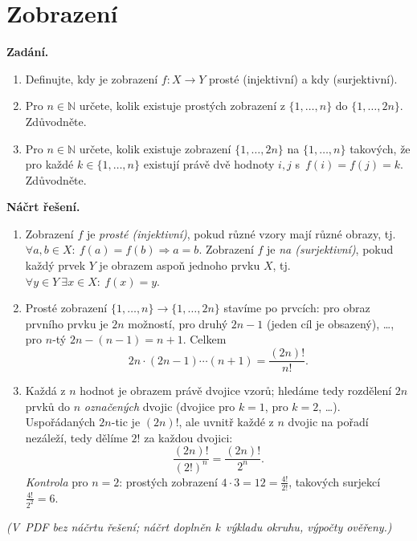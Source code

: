 \section{Zobrazení}

\noindent\textbf{Zadání.}\par
\begin{enumerate}
  \item Definujte, kdy je zobrazení $f\colon X\to Y$ prosté (injektivní) a kdy  (surjektivní).
  \item Pro $n\in\mathbb{N}$ určete, kolik existuje prostých zobrazení z $\{1,\dots,n\}$ do $\{1,\dots,2n\}$. Zdůvodněte.
  \item Pro $n\in\mathbb{N}$ určete, kolik existuje zobrazení $\{1,\dots,2n\}$ na $\{1,\dots,n\}$ takových, že pro každé $k\in\{1,\dots,n\}$ existují právě dvě hodnoty $i,j$ s~$f(i)=f(j)=k$. Zdůvodněte.
\end{enumerate}

\medskip
\noindent\textbf{Náčrt řešení.}\par
\begin{enumerate}
  \item Zobrazení $f$ je \emph{prosté (injektivní)}, pokud různé vzory mají různé obrazy, tj. $\forall a,b\in X:\ f(a)=f(b)\Rightarrow a=b$. Zobrazení $f$ je \emph{na (surjektivní)}, pokud každý prvek $Y$ je obrazem aspoň jednoho prvku $X$, tj. $\forall y\in Y\ \exists x\in X:\ f(x)=y$.
  \item Prosté zobrazení $\{1,\dots,n\}\to\{1,\dots,2n\}$ stavíme po prvcích: pro obraz prvního prvku je $2n$ možností, pro druhý $2n-1$ (jeden cíl je obsazený), \dots, pro $n$-tý $2n-(n-1)=n+1$. Celkem
    \[
      2n\cdot(2n-1)\cdots(n+1)=\frac{(2n)!}{n!}.
    \]
  \item Každá z $n$ hodnot je obrazem právě dvojice vzorů; hledáme tedy rozdělení $2n$ prvků do $n$ \emph{označených} dvojic (dvojice pro $k=1$, pro $k=2$, \dots). Uspořádaných $2n$-tic je $(2n)!$, ale uvnitř každé z $n$ dvojic na pořadí nezáleží, tedy dělíme $2!$ za každou dvojici:
    \[
      \frac{(2n)!}{(2!)^n}=\frac{(2n)!}{2^n}.
    \]
    \emph{Kontrola} pro $n=2$: prostých zobrazení $4\cdot3=12=\frac{4!}{2!}$, takových surjekcí $\frac{4!}{2^2}=6$.
\end{enumerate}

\medskip
\noindent\textit{(V~PDF bez náčrtu řešení; náčrt doplněn k~výkladu okruhu, výpočty ověřeny.)}
